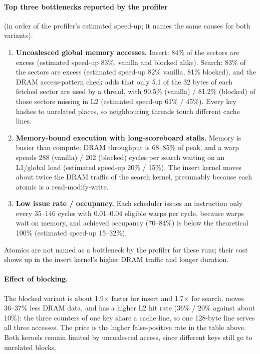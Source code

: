 \documentclass[11pt]{article}
\begin{document}
\paragraph{Top three bottlenecks reported by the profiler} (in order of the
profiler's estimated speed-up; it names the same causes for both variants).
\begin{enumerate}
\item \textbf{Uncoalesced global memory accesses.} Insert: 84\% of the
 sectors are excess (estimated speed-up 83\%, vanilla and blocked alike).
 Search: 83\% of the sectors are excess (estimated speed-up 82\% vanilla,
 81\% blocked), and the DRAM access-pattern check adds that only 5.1 of the 32
 bytes of each fetched sector are used by a thread, with 90.5\% (vanilla) /
 81.2\% (blocked) of those sectors missing in L2 (estimated speed-up 61\% /
 45\%). Every key hashes to unrelated places, so neighbouring threads touch
 different cache lines.
\item \textbf{Memory-bound execution with long-scoreboard stalls.} Memory is
 busier than compute: DRAM throughput is 68--85\% of peak, and a warp spends
 288 (vanilla) / 202 (blocked) cycles per search waiting on an L1/global load
 (estimated speed-up 20\% / 15\%). The insert kernel moves about twice the
 DRAM traffic of the search kernel, presumably because each atomic is a
 read-modify-write.
\item \textbf{Low issue rate / occupancy.} Each scheduler issues an
 instruction only every 35--146 cycles with 0.01--0.04 eligible warps per cycle,
 because warps wait on memory, and achieved occupancy (70--84\%) is below the
 theoretical 100\% (estimated speed-up 15--32\%).
\end{enumerate}
Atomics are not named as a bottleneck by the profiler for these runs; their
cost shows up in the insert kernel's higher DRAM traffic and longer duration.

\paragraph{Effect of blocking.} The blocked variant is about 1.9$\times$ faster
for insert and 1.7$\times$ for search, moves 36--37\% less DRAM data, and has a
higher L2 hit rate (36\% / 20\% against about 10\%): the three counters of one
key share a cache line, so one 128-byte line serves all three accesses. The
price is the higher false-positive rate in the table above. Both kernels remain
limited by uncoalesced access, since different keys still go to unrelated
blocks.
\end{document}
